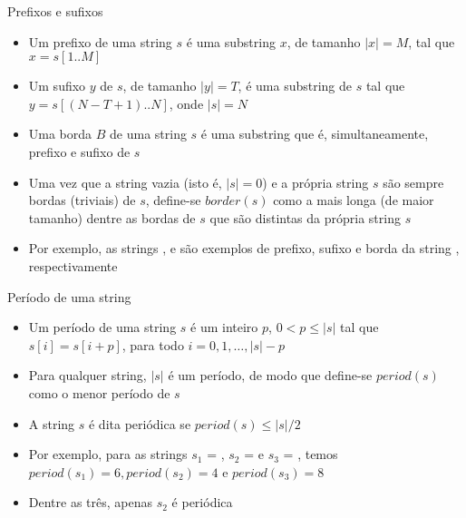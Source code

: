 \begin{frame}[fragile]{Prefixos e sufixos}

    \begin{itemize}
        \item Um prefixo de uma string $s$ é uma substring $x$, de tamanho $|x| = M$, tal que 
            $x = s[1..M]$
        \pause

        \item Um sufixo $y$ de $s$, de tamanho $|y| = T$, é uma substring de $s$ tal que 
            $y = s[(N - T + 1)..N]$, onde $|s| = N$

        \pause

        \item Uma borda $B$ de uma string $s$ é uma substring que é, simultaneamente, prefixo e 
            sufixo de $s$
        \pause

        \item Uma vez que a string vazia (isto é, $|s| = 0$) e a própria string $s$ são sempre 
            bordas (triviais) de $s$, define-se $border(s)$ como a mais longa 
            (de maior tamanho) dentre as bordas de $s$ que são distintas da própria string $s$
        \pause

        \item Por exemplo, as strings ,  e  são exemplos 
            de prefixo, sufixo e borda da string , respectivamente
    \end{itemize}

\end{frame}


\begin{frame}[fragile]{Período de uma string}

    \begin{itemize}

        \item Um período de uma string $s$ é um inteiro $p$, $0 < p \leq |s|$ tal que 
            $s[i] = s[i + p]$, para todo $i = {0, 1, \ldots, |s| - p}$
        \pause

        \item Para qualquer string, $|s|$ é um período, de modo que define-se 
            $period(s)$ como o menor período de $s$
        \pause

        \item A string $s$ é dita periódica se $period(s) \leq |s|/2$
        \pause

        \item Por exemplo, para as strings $s_1$ = , 
            $s_2$ =  e $s_3$ = , temos 
            $period(s_1) = 6, period(s_2) = 4$ e $period(s_3) = 8$
        \pause

        \item Dentre as três, apenas $s_2$ é periódica
    \end{itemize}

\end{frame}

